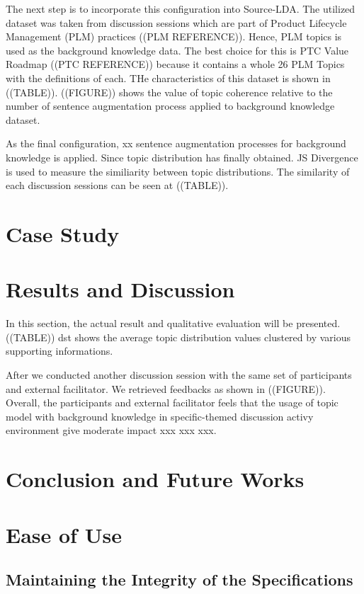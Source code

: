 \documentclass[conference]{IEEEtran}
\begin{document}
The next step is to incorporate this configuration into  Source-LDA. The utilized dataset was taken from discussion sessions which are part of Product Lifecycle Management (PLM) practices ((PLM REFERENCE)). Hence, PLM topics is used as the background knowledge data. The best choice for this is PTC Value Roadmap ((PTC REFERENCE)) because it contains a whole 26 PLM Topics with the definitions of each. THe characteristics of this dataset is shown in ((TABLE)). ((FIGURE)) shows the value of topic coherence relative to the number of sentence augmentation process applied to background knowledge dataset.

As the final configuration, xx sentence augmentation processes for background knowledge is applied. Since topic distribution has finally obtained. JS Divergence is used to measure the similiarity between topic distributions. The similarity of each discussion sessions can be seen at ((TABLE)). 

\section{Case Study}

\section{Results and Discussion}
In this section, the actual result and qualitative evaluation will be presented. ((TABLE)) dst shows the average topic distribution values clustered by various supporting informations.

After we conducted another discussion session with the same set of participants and external facilitator. We retrieved feedbacks as shown in ((FIGURE)). Overall, the participants and external facilitator feels that the usage of topic model with background knowledge in specific-themed discussion activy environment give moderate impact xxx xxx xxx. 

\section{Conclusion and Future Works}

\section{Ease of Use}

\subsection{Maintaining the Integrity of the Specifications}
\end{document}
